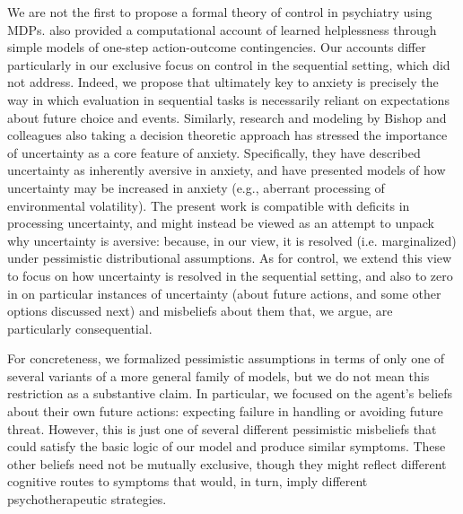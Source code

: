 \documentclass[manuscript]{stjour}
\begin{document}
We are not the first to propose a formal theory of control in psychiatry using MDPs. \cite{HuysDayan2009} also provided a computational account of learned helplessness through simple models of one-step action-outcome contingencies. Our accounts differ particularly in our exclusive focus on control in the sequential setting, which \citeauthor{HuysDayan2009} did not address. Indeed, we propose that ultimately key to anxiety is precisely the way in which evaluation in sequential tasks is necessarily reliant on expectations about future choice and events. Similarly, research and modeling by Bishop and colleagues \citep{browning2015, gagne2018} also taking a decision theoretic approach has stressed the importance of uncertainty as a core feature of anxiety. Specifically, they have described uncertainty as inherently aversive in anxiety, and have presented models of how uncertainty may be increased in anxiety (e.g., aberrant processing of environmental volatility). The present work is compatible with deficits in processing uncertainty, and might instead be viewed as an attempt to unpack why uncertainty is aversive: because, in our view, it is resolved (i.e. marginalized) under pessimistic distributional assumptions. As for control, we extend this view to focus on how uncertainty is resolved in the sequential setting, and also to zero in on particular instances of uncertainty (about future actions, and some other options discussed next) and misbeliefs about them that, we argue, are particularly consequential.

For concreteness, we formalized pessimistic assumptions in terms of only one of several variants of a more general family of models, but we do not mean this restriction as a substantive claim. In particular, we focused on the agent's beliefs about their own future actions: expecting failure in handling or avoiding future threat. However, this is just one of several different pessimistic misbeliefs that could satisfy the basic logic of our model and produce similar symptoms. These other beliefs need not be mutually exclusive, though they might reflect different cognitive routes to symptoms that would, in turn, imply different psychotherapeutic strategies.
\end{document}
